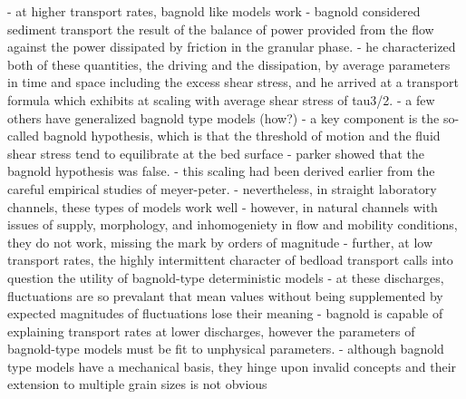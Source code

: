 \documentclass{article}
\begin{document}
- at higher transport rates, bagnold like models work 
- bagnold considered sediment transport the result of the balance of power provided from the flow against the power dissipated by friction in the granular phase. 
- he characterized both of these quantities, the driving and the dissipation, by average parameters in time and space including the excess shear stress, and he arrived at a transport formula which exhibits at scaling with average shear stress of tau3/2.
- a few others have generalized bagnold type models (how?) 
- a key component is the so-called bagnold hypothesis, which is that the threshold of motion and the fluid shear stress tend to equilibrate at the bed surface
- parker showed that the bagnold hypothesis was false.
- this scaling had been derived earlier from the careful empirical studies of meyer-peter. 
- nevertheless, in straight laboratory channels, these types of models work well 
- however, in natural channels with issues of supply, morphology, and inhomogeniety in flow and mobility conditions, they do not work, missing the mark by orders of magnitude
- further, at low transport rates, the highly intermittent character of bedload transport calls into question the utility of bagnold-type deterministic models 
- at these discharges, fluctuations are so prevalant that mean values without being supplemented by expected magnitudes of fluctuations lose their meaning
- bagnold is capable of explaining transport rates at lower discharges, however the parameters of bagnold-type models must be fit to unphysical parameters. 
- although bagnold type models have a mechanical basis, they hinge upon invalid concepts and their extension to multiple grain sizes is not obvious
\end{document}
